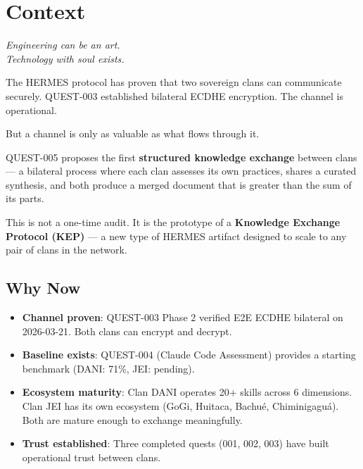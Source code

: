 \documentclass[11pt,a4paper]{article}
\begin{document}
\newpage

\tableofcontents
\newpage

\section{Context}

\epigraph{\itshape Engineering can be an art.\\Technology with soul exists.}{}

The HERMES protocol has proven that two sovereign clans can communicate
securely. QUEST-003 established bilateral ECDHE encryption. The channel
is operational.

But a channel is only as valuable as what flows through it.

QUEST-005 proposes the first \textbf{structured knowledge exchange} between
clans --- a bilateral process where each clan assesses its own practices,
shares a curated synthesis, and both produce a merged document that is
greater than the sum of its parts.

This is not a one-time audit. It is the prototype of a \textbf{Knowledge
Exchange Protocol (KEP)} --- a new type of HERMES artifact designed to
scale to any pair of clans in the network.

\subsection{Why Now}

\begin{itemize}
  \item \textbf{Channel proven}: QUEST-003 Phase 2 verified E2E ECDHE
    bilateral on 2026-03-21. Both clans can encrypt and decrypt.
  \item \textbf{Baseline exists}: QUEST-004 (Claude Code Assessment)
    provides a starting benchmark (DANI: 71\%, JEI: pending).
  \item \textbf{Ecosystem maturity}: Clan DANI operates 20+ skills across
    6 dimensions. Clan JEI has its own ecosystem (GoGi, Huitaca, Bachu\'e,
    Chiminigagu\'a). Both are mature enough to exchange meaningfully.
  \item \textbf{Trust established}: Three completed quests (001, 002, 003)
    have built operational trust between clans.
\end{itemize}
\end{document}
